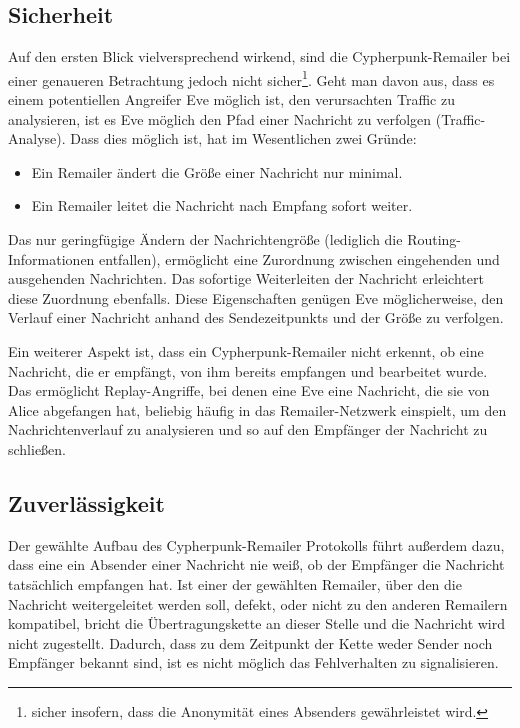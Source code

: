 \subsection{Sicherheit}
Auf den ersten Blick vielversprechend wirkend, sind die Cypherpunk-Remailer bei einer genaueren Betrachtung jedoch nicht sicher\footnote{sicher insofern, dass die Anonymität eines Absenders gewährleistet wird.}. Geht man davon aus, dass es einem potentiellen Angreifer Eve möglich ist, den verursachten Traffic zu analysieren, ist es Eve möglich den Pfad einer Nachricht zu verfolgen (Traffic-Analyse). Dass dies möglich ist, hat im Wesentlichen zwei Gründe: 
\begin{itemize}
\item Ein Remailer ändert die Größe einer Nachricht nur minimal.
\item Ein Remailer leitet die Nachricht nach Empfang sofort weiter.
\end{itemize} 
Das nur geringfügige Ändern der Nachrichtengröße (lediglich die Routing-Informationen entfallen), ermöglicht eine Zurordnung zwischen eingehenden und ausgehenden Nachrichten. Das sofortige Weiterleiten der Nachricht erleichtert diese Zuordnung ebenfalls. Diese Eigenschaften genügen Eve möglicherweise, den Verlauf einer Nachricht anhand des Sendezeitpunkts und der Größe zu verfolgen.

Ein weiterer Aspekt ist, dass ein Cypherpunk-Remailer nicht erkennt, ob eine Nachricht, die er empfängt, von ihm bereits empfangen und bearbeitet wurde. Das ermöglicht Replay-Angriffe, bei denen eine Eve eine Nachricht, die sie von Alice abgefangen hat, beliebig häufig in das Remailer-Netzwerk einspielt, um den Nachrichtenverlauf zu analysieren und so auf den Empfänger der Nachricht zu schließen.

\subsection{Zuverlässigkeit}
Der gewählte Aufbau des Cypherpunk-Remailer Protokolls führt außerdem dazu, dass eine ein Absender einer Nachricht nie weiß, ob der Empfänger die Nachricht tatsächlich empfangen hat. Ist einer der gewählten Remailer, über den die Nachricht weitergeleitet werden soll, defekt, oder nicht zu den anderen Remailern kompatibel, bricht die Übertragungskette an dieser Stelle und die Nachricht wird nicht zugestellt. Dadurch, dass zu dem Zeitpunkt der Kette weder Sender noch Empfänger bekannt sind, ist es nicht möglich das Fehlverhalten zu signalisieren. 